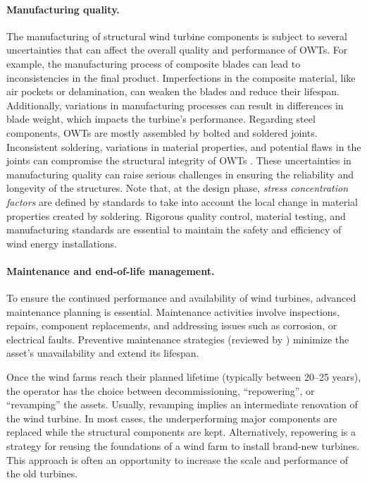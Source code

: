 \paragraph{Manufacturing quality.}
The manufacturing of structural wind turbine components is subject to several uncertainties that can affect the overall quality and performance of OWTs. 
For example, the manufacturing process of composite blades can lead to inconsistencies in the final product. 
Imperfections in the composite material, like air pockets or delamination, can weaken the blades and reduce their lifespan. 
Additionally, variations in manufacturing processes can result in differences in blade weight, which impacts the turbine's performance. 
Regarding steel components, OWTs are mostly assembled by bolted and soldered joints. 
Inconsistent soldering, variations in material properties, and potential flaws in the joints can compromise the structural integrity of OWTs \citep{veers_2019_review}. 
These uncertainties in manufacturing quality can raise serious challenges in ensuring the reliability and longevity of the structures. 
Note that, at the design phase, \textit{stress concentration factors} are defined by standards to take into account the local change in material properties created by soldering. 
Rigorous quality control, material testing, and manufacturing standards are essential to maintain the safety and efficiency of wind energy installations. 


\paragraph{Maintenance and end-of-life management.}
To ensure the continued performance and availability of wind turbines, advanced maintenance planning is essential. 
Maintenance activities involve inspections, repairs, component replacements, and addressing issues such as corrosion, or electrical faults. 
Preventive maintenance strategies (reviewed by \citealp{ren_2021_owt_maintenance}) minimize the asset's unavailability and extend its lifespan. 

Once the wind farms reach their planned lifetime (typically between 20--25 years), the operator has the choice between decommissioning, ``repowering'', or ``revamping'' the assets. 
Usually, revamping implies an intermediate renovation of the wind turbine. 
In most cases, the underperforming major components are replaced while the structural components are kept. 
Alternatively, repowering is a strategy for reusing the foundations of a wind farm to install brand-new turbines. 
This approach is often an opportunity to increase the scale and performance of the old turbines. 


